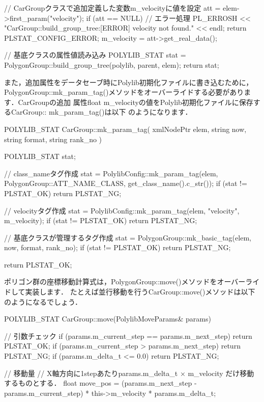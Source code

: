 {\begin{program}
{	// CarGroupクラスで追加定義した変数m_velocityに値を設定
	att = elem->first_param("velocity");
	if (att == NULL) {
		// エラー処理
		PL_ERROSH << "CarGroup::build_group_tree:[ERROR] velocity not found." 
			 << endl;
		return PLSTAT_CONFIG_ERROR;
	}
	m_velocity = att->get_real_data();

	// 基底クラスの属性値読み込み
	POLYLIB_STAT stat = PolygonGroup::build_group_tree(polylib, parent, elem);
	return stat;
}
\end{program}

また，追加属性をデータセーブ時にPolylib初期化ファイルに書き込むために，
PolygonGroup::mk\_param\_tag()メソッドをオーバーライドする必要があります．CarGroupの追加
属性float m\_velocityの値をPolylib初期化ファイルに保存するCarGroup:: mk\_param\_tag()は以下
のようになります．

\begin{program}
POLYLIB_STAT CarGroup::mk_param_tag(
	xmlNodePtr	elem,
	string		now,
	string		format,
	string		rank_no
){  
	POLYLIB_STAT	stat;

	// class_nameタグ作成
	stat = PolylibConfig::mk_param_tag(elem,
			PolygonGroup::ATT_NAME_CLASS, get_class_name().c_str());
	if (stat != PLSTAT_OK)	return PLSTAT_NG;

	// velocityタグ作成
	stat = PolylibConfig::mk_param_tag(elem, "velocity", m_velocity);
	if (stat != PLSTAT_OK)	return PLSTAT_NG;

	// 基底クラスが管理するタグ作成
	stat = PolygonGroup::mk_basic_tag(elem, now, format, rank_no);
	if (stat != PLSTAT_OK)	return PLSTAT_NG;

	return PLSTAT_OK;
}
\end{program}

ポリゴン群の座標移動計算式は，PolygonGroup::move()メソッドをオーバーライドして実装します．
たとえば並行移動を行うCarGroup::move()メソッドは以下のようになるでしょう．
\pagebreak
\begin{program}
POLYLIB_STAT
CarGroup::move(PolylibMoveParams&   params)
{
    // 引数チェック
    if (params.m_current_step == params.m_next_step)  return PLSTAT_OK;
    if (params.m_current_step > params.m_next_step)   return PLSTAT_NG;
    if (params.m_delta_t <= 0.0)                       return PLSTAT_NG;

    // 移動量
    // X軸方向に1stepあたりparams.m_delta_t × m_velocity だけ移動するものとする．
    float move_pos = (params.m_next_step - params.m_current_step) * 
                                         this->m_velocity * params.m_delta_t;

}
\end{program}}
